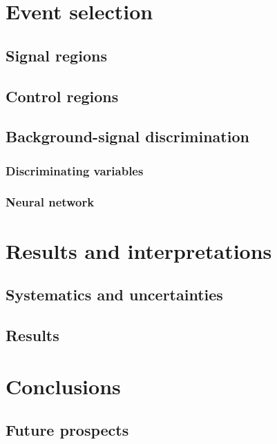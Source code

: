 \documentclass[a4paper, 10pt, openright]{report}
\begin{document}
\chapter{Event selection} \label{chapter:Selection}
\section{Signal regions}
\section{Control regions}
\section{Background-signal discrimination} \label{section:Discrimination}
\subsection{Discriminating variables}
\subsection{Neural network}

\chapter{Results and interpretations} \label{chapter:FinalResults}
\section{Systematics and uncertainties}
\section{Results}

\chapter{Conclusions} \label{chapter:Conclusion}
\section{Future prospects}

\begin{appendices}

\end{appendices}

\listoffigures 

\listoftables
\end{document}
